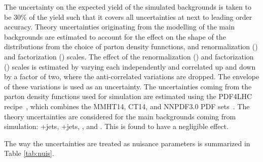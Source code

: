  The uncertainty on the expected yield of the simulated backgrounds is taken to be 30\% of the yield such that it covers all uncertainties at next to leading order accuracy. Theory uncertainties  originating from the modelling of the main backgrounds are estimated to account for the effect on the shape of the distributions from the choice of parton density funnctions, and renormalization (\muR) and factorization (\muF) scales. The effect of the  renormalization (\muR) and factorization (\muF) scales is estimated by varying each independently and correlated up and down by a factor of two, where the anti-correlated variations are dropped. The envelope of these variations is used as an uncertainty. The uncertainties coming from the parton density functions  used for simulation are estimated using the PDF4LHC recipe~\cite{Ball:2017nwa}, which combines the MMHT14, CT14, and NNPDF3.0 PDF sets~\cite{Ball:2017nwa}. The theory uncertainties are considered for the main backgrounds coming from simulation: \WZ+jets, \ZZ+jets, \ttZ, and \tZq. This is found to have a negligible effect.

 The way the uncertainties are treated as nuisance parameters is summarized in Table \ref{tab:nuis}.

